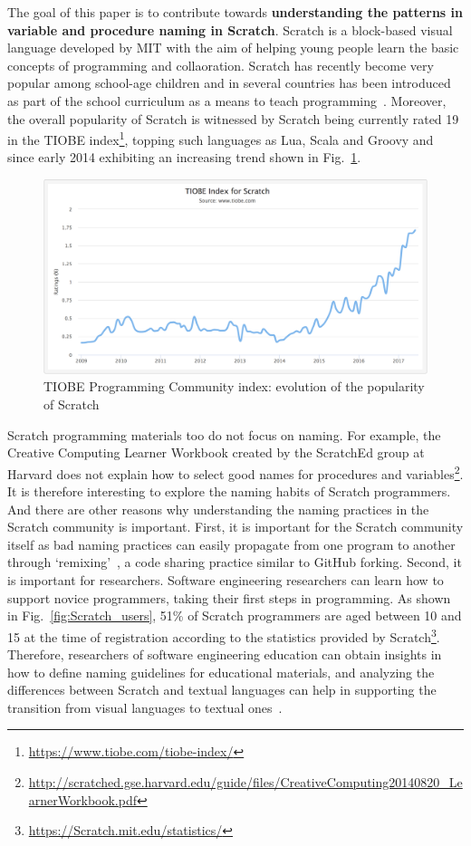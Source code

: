 \documentclass[conference]{IEEEtran}
\begin{document}
The goal of this paper is to contribute towards \textbf{understanding the patterns in variable and procedure naming in Scratch}. Scratch is a block-based visual language developed by MIT with the aim of helping young people learn the basic concepts of programming and collaoration. 
Scratch has recently become very popular among school-age children and in several countries has been introduced as part of the school curriculum as a means to teach programming~\cite{vanZyl,SaezLopez}.
Moreover, the overall popularity of Scratch is witnessed by Scratch being currently rated 19 in the TIOBE index\footnote{\url{https://www.tiobe.com/tiobe-index/}}, topping such languages as Lua, Scala and Groovy and since early 2014 exhibiting an increasing trend shown in Fig.~\ref{fig:tiobe}.
\begin{figure}[tb]
  \begin{center}
  \includegraphics[scale=0.25]{fig/tiobe}
  \caption{TIOBE Programming Community index: evolution of the popularity of Scratch}
  \label{fig:tiobe}
  \end{center}
\end{figure} 

Scratch programming materials too do not focus on naming. For example, the Creative Computing Learner Workbook created by the ScratchEd group at Harvard does not explain how to select good names for procedures and variables\footnote{\url{http://scratched.gse.harvard.edu/guide/files/CreativeComputing20140820_LearnerWorkbook.pdf}}. It is therefore interesting to explore the naming habits of Scratch programmers. And there are other reasons why understanding the naming practices in the Scratch community is important. First, it is important for the Scratch community itself as bad naming practices can easily propagate from one program to another through `remixing'~\cite{Hill:Monroy-Hernandez,Davis:Kafai:Vasudevan:Lee}, a code sharing practice similar to GitHub forking.
Second, it is important for researchers. Software engineering researchers can learn how to support novice programmers, taking their first steps in programming. As shown in Fig.~\ref{fig:Scratch_users}, 51\% of Scratch programmers are aged between 10 and 15 at the time of registration according to the statistics provided by Scratch\footnote{\url{https://Scratch.mit.edu/statistics/}}. Therefore, researchers of software engineering education can obtain insights in how to define naming guidelines for educational materials, and analyzing the differences between Scratch and textual languages can help in supporting the transition from visual languages to textual ones~\cite{Dann,Matsuzawa}. 
\end{document}
